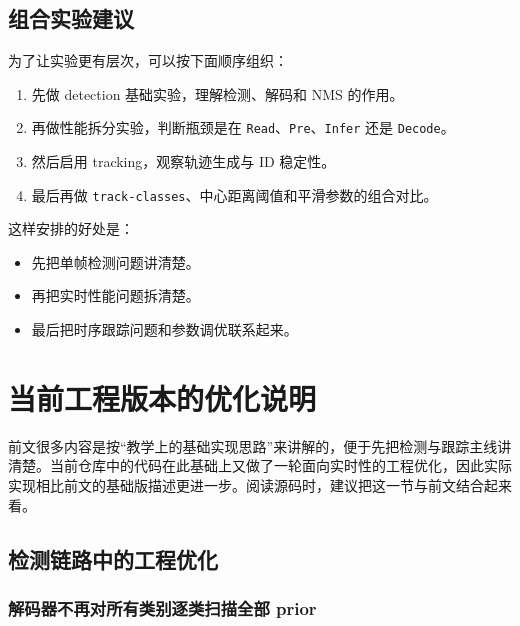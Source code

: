 \subsection{组合实验建议}\label{src-experiment-case2-h69}

为了让实验更有层次，可以按下面顺序组织：

\begin{enumerate}
\def\labelenumi{\arabic{enumi}.}
\tightlist
\item
  先做 detection 基础实验，理解检测、解码和 NMS 的作用。
\item
  再做性能拆分实验，判断瓶颈是在
  \passthrough{\lstinline!Read!}、\passthrough{\lstinline!Pre!}、\passthrough{\lstinline!Infer!}
  还是 \passthrough{\lstinline!Decode!}。
\item
  然后启用 tracking，观察轨迹生成与 ID 稳定性。
\item
  最后再做
  \passthrough{\lstinline!track-classes!}、中心距离阈值和平滑参数的组合对比。
\end{enumerate}

这样安排的好处是：

\begin{itemize}
\tightlist
\item
  先把单帧检测问题讲清楚。
\item
  再把实时性能问题拆清楚。
\item
  最后把时序跟踪问题和参数调优联系起来。
\end{itemize}

\section{当前工程版本的优化说明}\label{src-experiment-case2-h70}

前文很多内容是按``教学上的基础实现思路''来讲解的，便于先把检测与跟踪主线讲清楚。当前仓库中的代码在此基础上又做了一轮面向实时性的工程优化，因此实际实现相比前文的基础版描述更进一步。阅读源码时，建议把这一节与前文结合起来看。

\subsection{检测链路中的工程优化}\label{src-experiment-case2-h71}

\subsubsection{解码器不再对所有类别逐类扫描全部
prior}\label{src-experiment-case2-h72}

